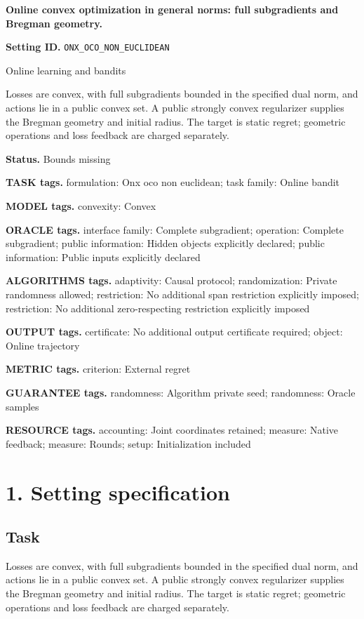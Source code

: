 \documentclass[10pt,a4paper]{article}
\begin{document}
\raggedright

{\LARGE\bfseries\sffamily\color{AtlasNavy} Online convex optimization in general norms: full subgradients and Bregman geometry.\par}\vspace{5pt}
\textbf{Setting ID.} \texttt{ONX\_\allowbreak{}OCO\_\allowbreak{}NON\_\allowbreak{}EUCLIDEAN}

Online learning and bandits

Losses are convex, with full subgradients bounded in the specified dual norm, and actions lie in a public convex set. A public strongly convex regularizer supplies the Bregman geometry and initial radius. The target is static regret; geometric operations and loss feedback are charged separately.

\textbf{Status.} Bounds missing

\textbf{TASK tags.} formulation: Onx oco non euclidean; task family: Online bandit

\textbf{MODEL tags.} convexity: Convex

\textbf{ORACLE tags.} interface family: Complete subgradient; operation: Complete subgradient; public information: Hidden objects explicitly declared; public information: Public inputs explicitly declared

\textbf{ALGORITHMS tags.} adaptivity: Causal protocol; randomization: Private randomness allowed; restriction: No additional span restriction explicitly imposed; restriction: No additional zero-respecting restriction explicitly imposed

\textbf{OUTPUT tags.} certificate: No additional output certificate required; object: Online trajectory

\textbf{METRIC tags.} criterion: External regret

\textbf{GUARANTEE tags.} randomness: Algorithm private seed; randomness: Oracle samples

\textbf{RESOURCE tags.} accounting: Joint coordinates retained; measure: Native feedback; measure: Rounds; setup: Initialization included

\section{1. Setting specification}
\subsection{Task}
Losses are convex, with full subgradients bounded in the specified dual norm, and actions lie in a public convex set. A public strongly convex regularizer supplies the Bregman geometry and initial radius. The target is static regret; geometric operations and loss feedback are charged separately.
\end{document}
